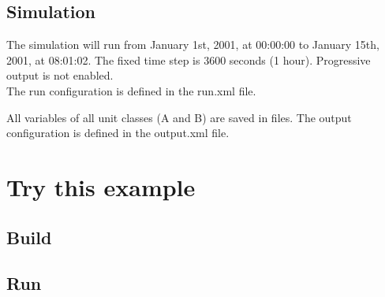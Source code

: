 \documentclass[a4paper,11pt]{article}
\begin{document}
\bigskip
\bigskip

\subsection{Simulation}

The simulation will run from January 1st, 2001, at 00:00:00 to January 15th, 2001, at 08:01:02.
The fixed time step is 3600 seconds (1 hour). Progressive output is not enabled.\\
\noindent The run configuration is defined in the run.xml file.\\

\bigskip

All variables of all unit classes (A and B) are saved in files. The output configuration is defined in the output.xml file.

\section{Try this example}

\subsection{Build}


\subsection{Run}
\end{document}
